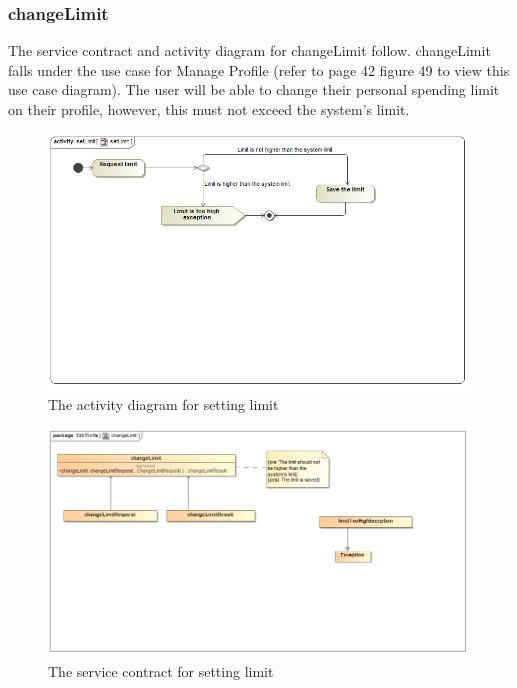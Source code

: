 \documentclass[a4paper,12pt]{report}
\begin{document}
\subsubsection{changeLimit}
The service contract and activity diagram for changeLimit follow. changeLimit falls under the use case for Manage Profile (refer to page 42 figure 49 to view this use case diagram). The user will be able to change their personal spending limit on their profile, however, this must not exceed the system's limit.
\begin{figure}[H]
  \centering
    \includegraphics[width=1.0\textwidth]{../Diagrams/ManageProfile/ActivityDiagrams/setLimit.png}
    \caption{The activity diagram for setting limit} 
\end{figure}

\begin{figure}[H]
	\centering
	\includegraphics[width=1.0\textwidth]{../Diagrams/ManageProfile/serviceContracts/changeLimitServiceContract.png}
	\caption{The service contract for setting limit}
\end{figure}
 
\end{document}
